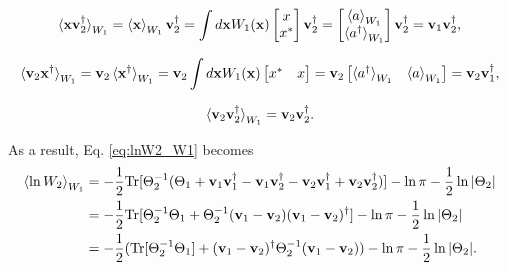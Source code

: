 \begin{apendicesenv}
\begin{equation}
        \braket{\mathbf{x} \mathbf{v}_2^\dagger}_{W_1} = \braket{\mathbf{x}}_{W_1} \mathbf{v}_2^\dagger = \int d\mathbf{x} W_1(\mathbf{x})
        \begin{bmatrix}
            x\\
            x^*
        \end{bmatrix} \mathbf{v}_2^\dagger = \begin{bmatrix}
            \braket{a}_{W_1}\\
            \braket{a^\dagger}_{W_1}
        \end{bmatrix} \mathbf{v}_2^\dagger = \mathbf{v}_1 \mathbf{v}_2^\dagger,
\end{equation}

\begin{equation}
        \braket{\mathbf{v}_2 \mathbf{x}^\dagger}_{W_1} = \mathbf{v}_2 \braket{\mathbf{x}^\dagger}_{W_1} = \mathbf{v}_2 \int d\mathbf{x} W_1(\mathbf{x})
        \begin{bmatrix}
            x^* & x
        \end{bmatrix} = \mathbf{v}_2 \begin{bmatrix}
            \braket{a^\dagger}_{W_1} & \braket{a}_{W_1}
        \end{bmatrix} = \mathbf{v}_2 \mathbf{v}_1^\dagger,
\end{equation}

\begin{equation}
        \braket{\mathbf{v}_2 \mathbf{v}_2^\dagger}_{W_1} = \mathbf{v}_2 \mathbf{v}_2^\dagger.
\end{equation}

\noindent As a result, Eq. \eqref{eq:lnW2_W1} becomes
\begin{equation}
    \begin{split}
        \braket{\ln W_2}_{W_1} &= - \frac{1}{2} \text{Tr}[ \Theta^{-1}_2 (\Theta_1 + \mathbf{v}_1 \mathbf{v}_1^\dagger - \mathbf{v}_1 \mathbf{v}_2^\dagger - \mathbf{v}_2 \mathbf{v}_1^\dagger + \mathbf{v}_2 \mathbf{v}_2^\dagger)] - \ln \pi -\frac{1}{2} \ln |\Theta_2|\\
        &= - \frac{1}{2} \text{Tr}[ \Theta^{-1}_2 \Theta_1 + \Theta^{-1}_2 (\mathbf{v}_1 - \mathbf{v}_2)(\mathbf{v}_1 - \mathbf{v}_2)^\dagger] - \ln \pi -\frac{1}{2} \ln |\Theta_2|\\
        &= - \frac{1}{2} (\text{Tr}[ \Theta^{-1}_2 \Theta_1] + (\mathbf{v}_1 - \mathbf{v}_2)^\dagger \Theta^{-1}_2 (\mathbf{v}_1 - \mathbf{v}_2)) - \ln \pi -\frac{1}{2} \ln |\Theta_2|.
    \end{split}
\end{equation}


\end{apendicesenv}
